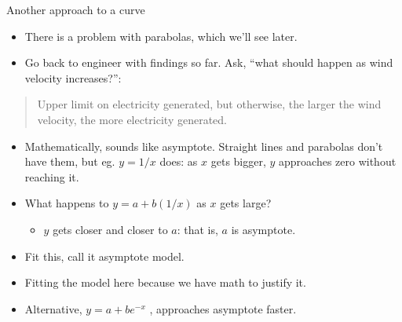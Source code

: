 \documentclass[ignorenonframetext,]{beamer}
\providecommand{\tightlist}{%
  \setlength{\itemsep}{0pt}\setlength{\parskip}{0pt}}
\begin{document}
\begin{frame}{Another approach to a curve}
\protect\hypertarget{another-approach-to-a-curve}{}

\begin{itemize}
\tightlist
\item
  There is a problem with parabolas, which we'll see later.
\item
  Go back to engineer with findings so far. Ask, ``what should happen as
  wind velocity increases?'':
\end{itemize}

\begin{quote}
Upper limit on electricity generated, but otherwise, the larger the wind
velocity, the more electricity generated.
\end{quote}

\begin{itemize}
\tightlist
\item
  Mathematically, sounds like asymptote. Straight lines and parabolas
  don't have them, but eg. \(y = 1/x\) does: as \(x\) gets bigger, \(y\)
  approaches zero without reaching it.
\item
  What happens to \(y = a + b(1/x)\) as \(x\) gets large?

  \begin{itemize}
  \tightlist
  \item
    \(y\) gets closer and closer to \(a\): that is, \(a\) is asymptote.
  \end{itemize}
\item
  Fit this, call it asymptote model.
\item
  Fitting the model here because we have math to justify it.
\item
  Alternative, \(y = a + be^{−x}\) , approaches asymptote faster.
\end{itemize}

\end{frame}
\end{document}
